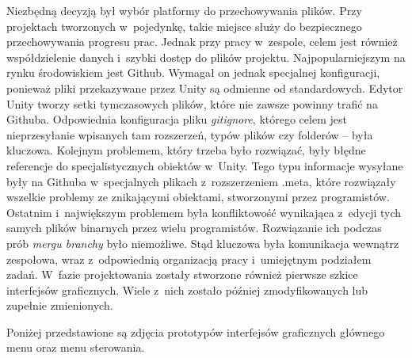 \documentclass[oneside,polski,logo]{amuthesis}
\begin{document}
Niezbędną decyzją był wybór platformy do przechowywania plików. Przy projektach tworzonych w~pojedynkę, takie miejsce służy do bezpiecznego przechowywania progresu prac. Jednak przy pracy w~zespole, celem jest również współdzielenie danych i~szybki dostęp do plików projektu. Najpopularniejszym na rynku środowiskiem jest Github. Wymagał on jednak specjalnej konfiguracji, ponieważ pliki przekazywane przez Unity są odmienne od standardowych. Edytor Unity tworzy setki tymczasowych plików, które nie zawsze powinny trafić na Githuba. Odpowiednia konfiguracja pliku \emph{gitignore}, którego celem jest nieprzesyłanie wpisanych tam rozszerzeń, typów plików czy folderów – była kluczowa. Kolejnym problemem, który trzeba było rozwiązać, były błędne referencje do specjalistycznych obiektów w~Unity. Tego typu informacje wysyłane były na Githuba w~specjalnych plikach z~rozszerzeniem .meta, które rozwiązały wszelkie problemy ze znikającymi obiektami, stworzonymi przez programistów. Ostatnim i~największym problemem była konfliktowość wynikająca z~edycji tych samych plików binarnych przez wielu programistów. Rozwiązanie ich podczas prób \emph{mergu branchy} było niemożliwe. Stąd kluczowa była komunikacja wewnątrz zespołowa, wraz z~odpowiednią organizacją pracy i~umiejętnym podziałem zadań. W~fazie projektowania zostały stworzone również pierwsze szkice interfejsów graficznych. Wiele z~nich zostało później zmodyfikowanych lub zupełnie zmienionych.

Poniżej przedstawione są zdjęcia prototypów interfejsów graficznych głównego menu oraz menu sterowania.
\end{document}
